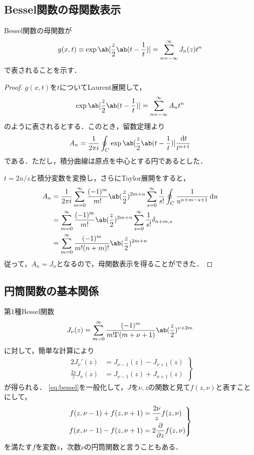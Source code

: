 \subsection{Bessel関数の母関数表示}
Bessel関数の母関数が
\begin{gather}
  g(x, t) \equiv \exp\ab[\frac{z}{2}\ab(t - \frac{1}{t})] =  \sum_{n=-\infty}^{\infty} J_n(z) t^n
\end{gather}
で表されることを示す．
\begin{proof}
  $g(x, t)$を$t$についてLaurent展開して，
  \begin{gather}
    \exp\ab[\frac{z}{2}\ab(t-\frac{1}{t})] = \sum_{n=-\infty}^{\infty}A_nt^n
  \end{gather}
  のように表されるとする．このとき，留数定理より
  \begin{gather}
    A_n = \frac{1}{2\pi i} \oint_C \exp\ab[\frac{z}{2}\ab(t - \frac{1}{t})] \frac{\dl{t}}{t^{n+1}}
  \end{gather}
  である．ただし，積分曲線は原点を中心とする円であるとした．

  $t = 2u / z$と積分変数を変換し，さらにTaylor展開をすると，
  \begin{align}
    A_n &= \frac{1}{2\pi i }\sum_{m=0}^{\infty} \frac{(-1)^m}{m!} \ab(\frac{z}{2})^{2m+n} \sum_{s=0}^{\infty} \frac{1}{s!} \oint_C \frac{1}{u^{n+m-s+1}} \dl{u} \notag\\
        &= \sum_{m=0}^{\infty} \frac{(-1)^m}{m!} \ab(\frac{z}{2})^{2m+n} \sum_{s=0}^{\infty} \frac{1}{s!} \delta_{n+m, s} \notag\\
        &= \sum_{m=0}^{\infty} \frac{(-1)^m}{m! (n+m)!}\ab(\frac{z}{2})^{2m+n}
  \end{align}
  従って，$A_n = J_n$となるので，母関数表示を得ることができた．
\end{proof}

\subsection{円筒関数の基本関係}
第1種Bessel関数
\begin{gather}
  J_\nu(z) = \sum_{m=0}^{\infty} \frac{(-1)^m}{m! \Gamma(m+\nu+1)}\ab(\frac{z}{2})^{\nu+2m}
\end{gather}
に対して，簡単な計算により
\begin{gather}
  \label{eq:bessel}
  \left.
    \begin{aligned}
      2J_\nu'(z) &= J_{\nu-1}(z) - J_{\nu+1}(z) \\
      \frac{2\nu}{z}J_\nu(z) &= J_{\nu-1}(z) + J_{\nu+1}(z)
    \end{aligned}
  \right\}
\end{gather}
が得られる．
\eqref{eq:bessel}を一般化して，$J$を$\nu, z$の関数と見て$f(z, \nu)$と表すことにして，
\begin{gather}  
  \left.
  \begin{aligned}
    f(z, \nu-1) + f(z, \nu+1) &= \frac{2\nu}{z}f(z, \nu)\\
    f(x, \nu-1) - f(z, \nu+1) &= 2\diffp**{z}{f(z, \nu)}
  \end{aligned}
  \right\}
\end{gather}
を満たす$f$を変数$z$，次数$\nu$の円筒関数と言うこともある．

